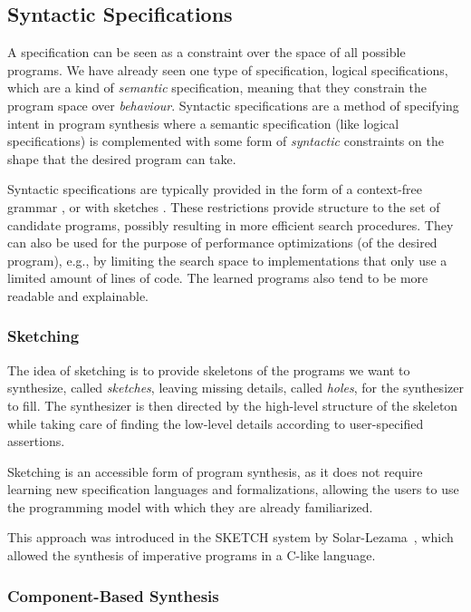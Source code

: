\subsection{Syntactic Specifications}
\label{sec:syntactic-specifications}

A specification can be seen as a constraint over the space of all possible
programs. We have already seen one type of specification, logical
specifications, which are a kind of \textit{semantic} specification, meaning
that they constrain the program space over \textit{behaviour}. Syntactic
specifications are a method of specifying intent in program synthesis where a
semantic specification (like logical specifications) is complemented with some
form of \textit{syntactic} constraints on the shape that the desired program can
take.

Syntactic specifications are typically provided in the form of a context-free
grammar \cite{Alur:sygus:2013}, or with sketches \cite{Solar-Lezama:2008}. These
restrictions provide structure to the set of candidate programs, possibly
resulting in more efficient search procedures. They can also be used for the
purpose of performance optimizations (of the desired program), e.g., by limiting
the search space to implementations that only use a limited amount of lines of
code. The learned programs also tend to be more readable and explainable.

\subsubsection{Sketching}
\label{sec:sketching}

The idea of sketching is to provide skeletons of the programs we want to
synthesize, called \textit{sketches}, leaving missing details, called
\textit{holes}, for the synthesizer to fill. The synthesizer is then directed by
the high-level structure of the skeleton while taking care of finding the
low-level details according to user-specified assertions.

Sketching is an accessible form of program synthesis, as it does not require
learning new specification languages and formalizations, allowing the users to
use the programming model with which they are already familiarized.

This approach was introduced in the SKETCH system by
Solar-Lezama~\cite{Solar-Lezama:2008}, which allowed the synthesis of imperative
programs in a C-like language.

\subsubsection{Component-Based Synthesis}
\label{sec:components}

